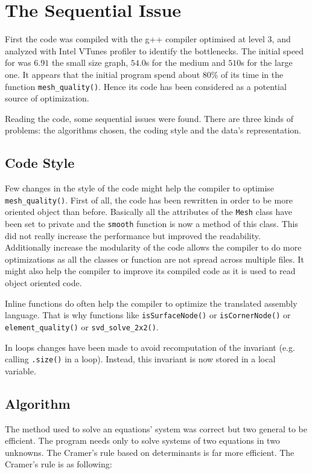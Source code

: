 \documentclass[fleqn,11pt]{SelfArx} %
\theoremstyle{definition}
\begin{document}
\section{The Sequential Issue}
First the code was compiled with the g++ compiler optimised at level 3, and analyzed with Intel VTunes profiler to identify the bottlenecks. The initial speed for was $6.91$ the small size graph, $54.0$s for the medium and $510$s for the large one. It appears that the initial program spend about 80\% of its time in the function \verb+mesh_quality()+. Hence its code has been considered as a potential source of optimization.

Reading the code, some sequential issues were found. There are three kinds of problems: the algorithms chosen, the coding style and the data's representation.

\subsection{Code Style}

Few changes in the style of the code might help the compiler to optimise \verb+mesh_quality()+. First of all, the code has been rewritten in order to be more oriented object than before. Basically all the attributes of the \verb+Mesh+ class have been set to private and the \verb+smooth+ function is now a method of this class. This did not really increase the performance but improved the readability. Additionally increase the modularity of the code allows the compiler to do more optimizations as all the classes or function are not spread across multiple files. It might also help the compiler to improve its compiled code as it is used to read object oriented code. 

Inline functions do often help the compiler to optimize the translated assembly language. That is why functions like \verb+isSurfaceNode()+ or \verb+isCornerNode()+ or \verb+element_quality()+ or \verb+svd_solve_2x2()+.

In loops changes have been made to avoid recomputation of the invariant (e.g. calling \verb+.size()+ in a loop). Instead, this invariant is now stored in a local variable.

\subsection{Algorithm}

The method used to solve an equations' system was correct but two general to be efficient. The program needs only to solve systems of two equations in two unknowns. The Cramer's rule based on determinants is far more efficient. The Cramer's rule is as following:
\end{document}
